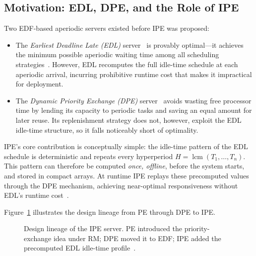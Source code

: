 \documentclass[conference]{IEEEtran}
\begin{document}
\subsection{Motivation: EDL, DPE, and the Role of IPE}

Two EDF-based aperiodic servers existed before IPE was
proposed:
\begin{itemize}
  \item The \emph{Earliest Deadline Late (EDL)}
    server~\cite{spuri1994} is provably optimal---it achieves
    the minimum possible aperiodic waiting time among all
    scheduling strategies~\cite{chetto1989}. However, EDL
    recomputes the full idle-time schedule at each aperiodic
    arrival, incurring prohibitive runtime cost that makes it
    impractical for deployment.
  \item The \emph{Dynamic Priority Exchange (DPE)}
    server~\cite{spuri1996} avoids wasting free processor time
    by lending its capacity to periodic tasks and saving an
    equal amount for later reuse. Its replenishment strategy
    does not, however, exploit the EDL idle-time structure,
    so it falls noticeably short of optimality.
\end{itemize}

IPE's core contribution is conceptually simple: the idle-time
pattern of the EDL schedule is deterministic and repeats
every hyperperiod $H = \operatorname{lcm}(T_1,\ldots,T_n)$.
This pattern can therefore be computed \emph{once, offline},
before the system starts, and stored in compact arrays. At
runtime IPE replays these precomputed values through the DPE
mechanism, achieving near-optimal responsiveness without
EDL's runtime cost~\cite{buttazzo2011}.

Figure~\ref{fig:lineage} illustrates the design lineage from
PE through DPE to IPE.

\begin{figure}[t]
\centering
{}
\caption{Design lineage of the IPE server. PE introduced
  the priority-exchange idea under RM; DPE moved it to EDF;
  IPE added the precomputed EDL idle-time
  profile~\cite{spuri1996}.}
\label{fig:lineage}
\end{figure}
\end{document}
